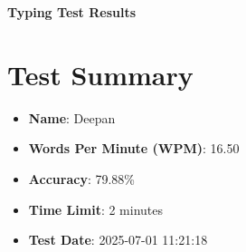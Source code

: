 \documentclass[a4paper,12pt]{article}
\begin{document}
\begin{center}
\textbf{Typing Test Results} \\[0.5cm]
\end{center}

\section*{Test Summary}
\begin{itemize}
    \item \textbf{Name}: Deepan
    \item \textbf{Words Per Minute (WPM)}: 16.50
    \item \textbf{Accuracy}: 79.88\%
    \item \textbf{Time Limit}: 2 minutes
    \item \textbf{Test Date}: 2025-07-01 11:21:18
\end{itemize}
\end{document}
